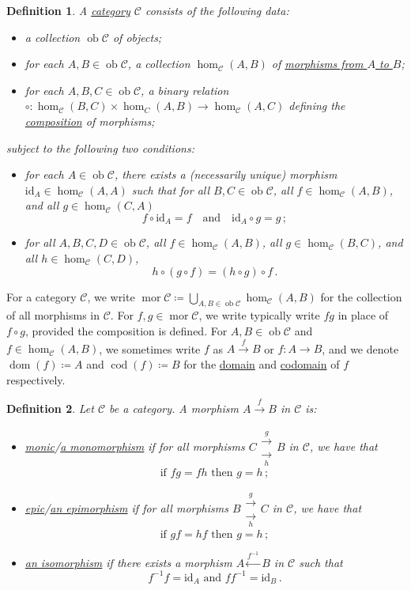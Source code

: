 \documentclass[a4paper,11pt]{article}
\theoremstyle{break_italics}
\newtheorem*{definition*}{Definition}
\theoremstyle{break_upright}
\theoremstyle{remark}
\newcommand{\id}{\mathrm{id}}
\newcommand{\ob}{\operatorname{ob}}
\newcommand{\mor}{\operatorname{mor}}
\newcommand{\C}{\mathcal{C}}
\newcommand{\dom}{\operatorname{dom}}
\newcommand{\cod}{\operatorname{cod}}
\begin{document}
\begin{definition*}
	A \uline{category} $\C$ consists of the following data:
	\begin{itemize}
		\item a collection $\ob\C$ of objects;
		\item for each $A,B\in\ob\C$, a collection $\hom_\C(A,B)$ of \uline{morphisms from $A$ to $B$};
		\item for each $A,B,C \in \ob\C$, a binary relation $\circ \colon \hom_\C(B,C) \times \hom_C(A,B) \to \hom_\C(A,C)$ defining the \uline{composition} of morphisms;
	\end{itemize}
	subject to the following two conditions:
	\begin{itemize}
		\item for each $A \in \ob\C$, there exists a (necessarily unique) morphism $\id_A \in \hom_\C(A,A)$ such that for all $B,C \in \ob\C$, all $f \in \hom_\C(A, B)$, and all $g \in \hom_\C(C,A)$
			\[
				f \circ \id_A = f \quad \text{and} \quad  \id_A \circ g = g\,;
			\]
		\item for all $A,B,C,D \in\ob\C$, all $f \in \hom_\C(A,B)$, all $g \in \hom_\C(B,C)$, and all $h \in \hom_\C(C,D)$,
			\[
				h \circ (g \circ f) = (h \circ g) \circ f\,.
			\]
	\end{itemize}
\end{definition*}

For a category $\C$, we write $\mor\C \coloneqq \bigcup_{A,B\in\ob\C} \hom_\C(A,B)$ for the collection of all morphisms in $\C$. For $f,g\in\mor\C$, we write typically write $fg$ in place of $f \circ g$, provided the composition is defined. For $A,B \in \ob\C$ and $f \in \hom_\C(A,B)$, we sometimes write $f$ as $A \xrightarrow{f} B$ or $f \colon A \to B$, and we denote $\dom(f) \coloneqq A$ and $\cod(f) \coloneqq B$ for the \uline{domain} and \uline{codomain} of $f$ respectively.

\begin{definition*}
	Let $\C$ be a category. A morphism $A \xrightarrow{f} B$ in $\C$ is:
	\begin{itemize}
		\item \uline{monic}/\uline{a monomorphism} if for all morphisms $C \substack{\xrightarrow{g} \\ \xrightarrow[h]{}} B$ in $\C$, we have that
			\[
				\text{if } fg = fh \text{ then } g = h\,;
			\]
		\item \uline{epic}/\uline{an epimorphism} if for all morphisms $B \substack{\xrightarrow{g} \\ \xrightarrow[h]{}} C$ in $\C$, we have that
			\[
				\text{if } gf = hf \text{ then } g = h\,;
			\]
		\item \uline{an isomorphism} if there exists a morphism $A \xleftarrow{f^{-1}} B$ in $\C$ such that
			\[
				f^{-1}f = \id_A \text{ and } ff^{-1} = \id_B\,.
			\]
	\end{itemize}
\end{definition*}
\end{document}
